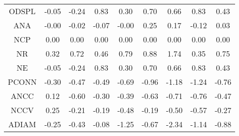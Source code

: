 \documentclass[11pt,a4paper]{report}
\begin{document}
\begin{longtable}{ | c || c | c | c | c | c | c | c || c |}
ODSPL &  \cellcolor[HTML]{FFFFFF} -0.05 &  \cellcolor[HTML]{FFF7F7} -0.24 &  \cellcolor[HTML]{E7E7FF} 0.83 &  \cellcolor[HTML]{F7F7FF} 0.30 &  \cellcolor[HTML]{EFEFFF} 0.70 &  \cellcolor[HTML]{EFEFFF} 0.66 &  \cellcolor[HTML]{E7E7FF} 0.83 &  \cellcolor[HTML]{F7F7FF} 0.43 \\
ANA &  \cellcolor[HTML]{FFFFFF} -0.00 &  \cellcolor[HTML]{FFFFFF} -0.02 &  \cellcolor[HTML]{FFFFFF} -0.07 &  \cellcolor[HTML]{FFFFFF} -0.00 &  \cellcolor[HTML]{F7F7FF} 0.25 &  \cellcolor[HTML]{F7F7FF} 0.17 &  \cellcolor[HTML]{FFFFFF} -0.12 &  \cellcolor[HTML]{FFFFFF} 0.03 \\
NCP &  \cellcolor[HTML]{FFFFFF} 0.00 &  \cellcolor[HTML]{FFFFFF} 0.00 &  \cellcolor[HTML]{FFFFFF} 0.00 &  \cellcolor[HTML]{FFFFFF} 0.00 &  \cellcolor[HTML]{FFFFFF} 0.00 &  \cellcolor[HTML]{FFFFFF} 0.00 &  \cellcolor[HTML]{FFFFFF} 0.00 &  \cellcolor[HTML]{FFFFFF} 0.00 \\
NR &  \cellcolor[HTML]{F7F7FF} 0.32 &  \cellcolor[HTML]{EFEFFF} 0.72 &  \cellcolor[HTML]{F7F7FF} 0.46 &  \cellcolor[HTML]{EFEFFF} 0.79 &  \cellcolor[HTML]{E7E7FF} 0.88 &  \cellcolor[HTML]{D7D7FF} 1.74 &  \cellcolor[HTML]{F7F7FF} 0.35 &  \cellcolor[HTML]{EFEFFF} 0.75 \\
NE &  \cellcolor[HTML]{FFFFFF} -0.05 &  \cellcolor[HTML]{FFF7F7} -0.24 &  \cellcolor[HTML]{E7E7FF} 0.83 &  \cellcolor[HTML]{F7F7FF} 0.30 &  \cellcolor[HTML]{EFEFFF} 0.70 &  \cellcolor[HTML]{EFEFFF} 0.66 &  \cellcolor[HTML]{E7E7FF} 0.83 &  \cellcolor[HTML]{F7F7FF} 0.43 \\
PCONN &  \cellcolor[HTML]{FFF7F7} -0.30 &  \cellcolor[HTML]{FFF7F7} -0.47 &  \cellcolor[HTML]{FFEFEF} -0.49 &  \cellcolor[HTML]{FFEFEF} -0.69 &  \cellcolor[HTML]{FFE7E7} -0.96 &  \cellcolor[HTML]{FFDFDF} -1.18 &  \cellcolor[HTML]{FFDFDF} -1.24 &  \cellcolor[HTML]{FFEFEF} -0.76 \\
ANCC &  \cellcolor[HTML]{FFFFFF} 0.12 &  \cellcolor[HTML]{FFEFEF} -0.60 &  \cellcolor[HTML]{FFF7F7} -0.30 &  \cellcolor[HTML]{FFF7F7} -0.39 &  \cellcolor[HTML]{FFEFEF} -0.63 &  \cellcolor[HTML]{FFEFEF} -0.71 &  \cellcolor[HTML]{FFEFEF} -0.76 &  \cellcolor[HTML]{FFF7F7} -0.47 \\
NCCV &  \cellcolor[HTML]{F7F7FF} 0.25 &  \cellcolor[HTML]{FFF7F7} -0.21 &  \cellcolor[HTML]{FFF7F7} -0.19 &  \cellcolor[HTML]{FFEFEF} -0.48 &  \cellcolor[HTML]{FFF7F7} -0.19 &  \cellcolor[HTML]{FFEFEF} -0.50 &  \cellcolor[HTML]{FFEFEF} -0.57 &  \cellcolor[HTML]{FFF7F7} -0.27 \\
ADIAM &  \cellcolor[HTML]{FFF7F7} -0.25 &  \cellcolor[HTML]{FFF7F7} -0.43 &  \cellcolor[HTML]{FFFFFF} -0.08 &  \cellcolor[HTML]{FFDFDF} -1.25 &  \cellcolor[HTML]{FFEFEF} -0.67 &  \cellcolor[HTML]{FFC7C7} -2.34 &  \cellcolor[HTML]{FFDFDF} -1.14 &  \cellcolor[HTML]{FFE7E7} -0.88 \\

\end{longtable}
\end{document}
